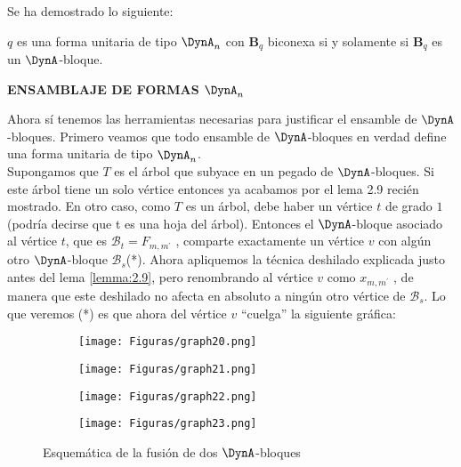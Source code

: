 Se ha demostrado lo siguiente:
\begin{lemma}
$q$ es una forma unitaria de tipo $\DynA_{n}$ con $\textbf{B}_{q}$ biconexa si y solamente si $\textbf{B}_{q}$ es un $\DynA$-bloque.
\label{lemma:2.9}
\end{lemma}

\textbf{ENSAMBLAJE DE FORMAS $\DynA_{n}$}

Ahora sí tenemos las herramientas necesarias para justificar el ensamble de $\DynA$-bloques. Primero veamos que todo ensamble de $\DynA$-bloques en verdad define una forma unitaria de tipo $\DynA_{n}$.\\

Supongamos que $T$ es el árbol que subyace en un pegado de $\DynA$-bloques. Si este árbol tiene un solo vértice entonces ya acabamos por el lema 2.9 recién mostrado. En otro caso, como $T$ es un árbol, debe haber un vértice $t$ de grado $1$ (podría decirse que t es una hoja del árbol). Entonces el $\DynA$-bloque asociado al vértice $t$, que es $\mathcal{B}_{t} = F_{m, m^{'}}$ , comparte exactamente un vértice $v$ con algún otro $\DynA$-bloque  $\mathcal{B}_{s}$(*). Ahora apliquemos la técnica deshilado explicada justo antes del lema \ref{lemma:2.9}, pero renombrando al vértice $v$ como $x_{m, m^{'}}$ , de manera que este deshilado no afecta en absoluto a ningún otro vértice de $\mathcal{B}_{s}$. Lo que veremos (*) es que ahora del vértice $v$ “cuelga” la siguiente gráfica:

\begin{figure}[h]
    \begin{subfigure}[b]{0.2\textwidth}
      \begin{minipage}{4cm}
	\centering%
	    \texttt{[image: Figuras/graph20.png]}
	 \end{minipage}
	 \caption{}
     \end{subfigure}
     \begin{subfigure}[b]{0.2\textwidth}
        \begin{minipage}{4cm}
       	 \centering%
	    \texttt{[image: Figuras/graph21.png]}
        \end{minipage}
        \caption{}
     \end{subfigure}
     \begin{subfigure}[b]{0.2\textwidth}
        \begin{minipage}{4cm}
       	 \centering%
	    \texttt{[image: Figuras/graph22.png]}
        \end{minipage}
        \caption{}
     \end{subfigure}
      \begin{subfigure}[b]{0.2\textwidth}
      \begin{minipage}{4cm}
	\centering%
	    \texttt{[image: Figuras/graph23.png]}
	 \end{minipage}
	 \caption{}
     \end{subfigure}
     \caption{Esquemática de la fusión de dos $\DynA$-bloques}
    \label{figura:2.7}
\end{figure}

